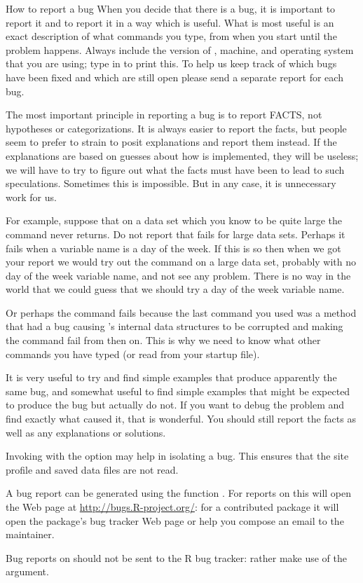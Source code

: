 %
\begin{Section}{How to report a bug}
When you decide that there is a bug, it is important to report it and
to report it in a way which is useful.  What is most useful is an
exact description of what commands you type, from when you start \R{}
until the problem happens.  Always include the version of \R{}, machine,
and operating system that you are using; type  in \R{} to
print this.  To help us keep track of which bugs have been fixed and
which are still open please send a separate report for each bug.

The most important principle in reporting a bug is to report FACTS,
not hypotheses or categorizations.  It is always easier to report the
facts, but people seem to prefer to strain to posit explanations and
report them instead.  If the explanations are based on guesses about
how \R{} is implemented, they will be useless; we will have to try to
figure out what the facts must have been to lead to such
speculations.  Sometimes this is impossible.  But in any case, it is
unnecessary work for us.

For example, suppose that on a data set which you know to be quite
large the command  never
returns.  Do not report that  fails for large data
sets.  Perhaps it fails when a variable name is a day of the week.  If
this is so then when we got your report we would try out the
 command on a large data set, probably with no day
of the week variable name, and not see any problem. There is no way in
the world that we could guess that we should try a day of the week
variable name.

Or perhaps the command fails because the last command you used was a
\code{[} method that had a bug causing \R{}'s internal data structures
to be corrupted and making the  command fail from
then on.  This is why we need to know what other commands you have
typed (or read from your startup file).

It is very useful to try and find simple examples that produce
apparently the same bug, and somewhat useful to find simple examples
that might be expected to produce the bug but actually do not.  If you
want to debug the problem and find exactly what caused it, that is
wonderful.  You should still report the facts as well as any
explanations or solutions.

Invoking \R{} with the  option may help in isolating a
bug.  This ensures that the site profile and saved data files are not
read.

A bug report can be generated using the function .
For reports on \R{} this will open the Web page at
\url{http://bugs.R-project.org/}: for a contributed package it will
open the package's bug tracker Web page or help you compose an email
to the maintainer.

Bug reports on  should not be sent to the
R bug tracker: rather make use of the  argument.
\end{Section}
